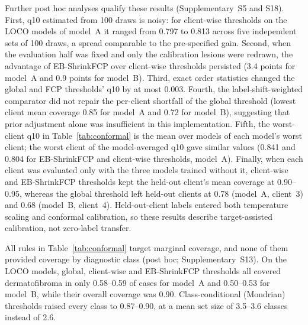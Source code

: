 Further post hoc analyses qualify these results (Supplementary~S5 and S18). First, q10 estimated from 100
draws is noisy: for client-wise thresholds on the LOCO models of model~A it ranged from 0.797 to 0.813 across
five independent sets of 100 draws, a spread comparable to the pre-specified gain. Second, when the
evaluation half was fixed and only the calibration lesions were redrawn, the advantage of EB-ShrinkFCP over
client-wise thresholds persisted (3.4 points for model~A and 0.9 points for model~B). Third, exact order
statistics changed the global and FCP thresholds' q10 by at most 0.003. Fourth, the label-shift-weighted
comparator did not repair the per-client shortfall of the global threshold (lowest client mean coverage
0.85 for model~A and 0.72 for model~B), suggesting that prior adjustment alone was insufficient in this
implementation. Fifth, the worst-client q10 in Table~\ref{tab:conformal} is the mean over models of each
model's worst client; the worst client of the model-averaged q10 gave similar values (0.841 and 0.804 for
EB-ShrinkFCP and client-wise thresholds, model~A). Finally, when each client was evaluated only with the
three models trained without it, client-wise and EB-ShrinkFCP thresholds kept the held-out client's mean
coverage at 0.90--0.95, whereas the global threshold left held-out clients at 0.78 (model~A, client~3) and
0.68 (model~B, client~4). Held-out-client labels entered both temperature scaling and conformal calibration,
so these results describe target-assisted calibration, not zero-label transfer.

All rules in Table~\ref{tab:conformal} target marginal coverage, and none of them provided coverage by
diagnostic class (post hoc; Supplementary~S13). On the LOCO models, global, client-wise and EB-ShrinkFCP
thresholds all covered dermatofibroma in only 0.58--0.59 of cases for model~A and 0.50--0.53 for model~B,
while their overall coverage was 0.90. Class-conditional (Mondrian) thresholds raised every class to
0.87--0.90, at a mean set size of 3.5--3.6 classes instead of 2.6.

